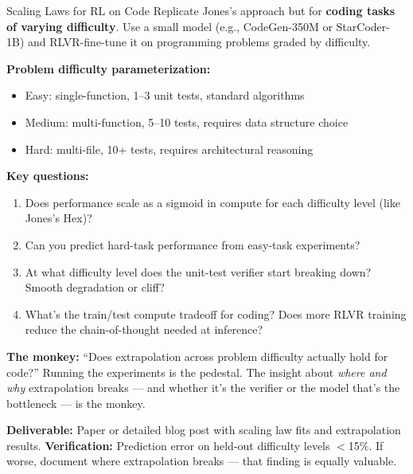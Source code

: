 \begin{portfolio}{Scaling Laws for RL on Code}
Replicate Jones's approach but for \textbf{coding tasks of varying difficulty}. Use a small model (e.g., CodeGen-350M or StarCoder-1B) and RLVR-fine-tune it on programming problems graded by difficulty.

\textbf{Problem difficulty parameterization:}
\begin{itemize}
  \item Easy: single-function, 1--3 unit tests, standard algorithms
  \item Medium: multi-function, 5--10 tests, requires data structure choice
  \item Hard: multi-file, 10+ tests, requires architectural reasoning
\end{itemize}

\textbf{Key questions:}
\begin{enumerate}
  \item Does performance scale as a sigmoid in compute for each difficulty level (like Jones's Hex)?
  \item Can you predict hard-task performance from easy-task experiments?
  \item At what difficulty level does the unit-test verifier start breaking down? Smooth degradation or cliff?
  \item What's the train/test compute tradeoff for coding? Does more RLVR training reduce the chain-of-thought needed at inference?
\end{enumerate}

\textbf{The monkey:} ``Does extrapolation across problem difficulty actually hold for code?'' Running the experiments is the pedestal. The insight about \textit{where and why} extrapolation breaks --- and whether it's the verifier or the model that's the bottleneck --- is the monkey.

\textbf{Deliverable:} Paper or detailed blog post with scaling law fits and extrapolation results. \textbf{Verification:} Prediction error on held-out difficulty levels $<$15\%. If worse, document where extrapolation breaks --- that finding is equally valuable.
\end{portfolio}

\newpage
